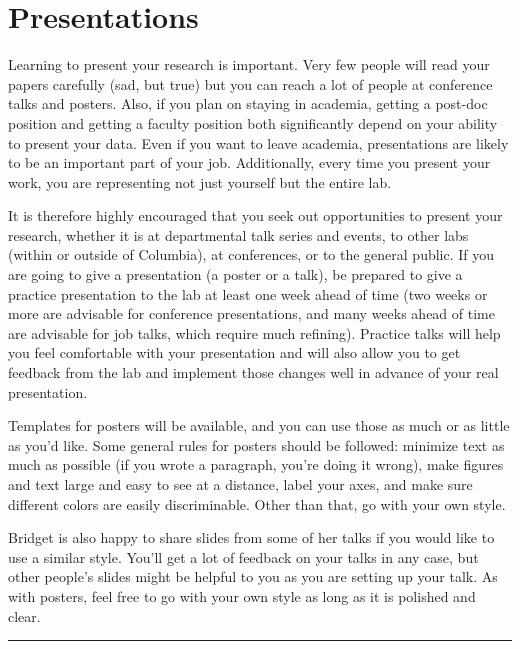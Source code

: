 \documentclass[]{book}
\begin{document}
\hypertarget{presentations}{%
\section{Presentations}\label{presentations}}

Learning to present your research is important. Very few people will read your papers carefully (sad, but true) but you can reach a lot of people at conference talks and posters. Also, if you plan on staying in academia, getting a post-doc position and getting a faculty position both significantly depend on your ability to present your data. Even if you want to leave academia, presentations are likely to be an important part of your job. Additionally, every time you present your work, you are representing not just yourself but the entire lab.

It is therefore highly encouraged that you seek out opportunities to present your research, whether it is at departmental talk series and events, to other labs (within or outside of Columbia), at conferences, or to the general public. If you are going to give a presentation (a poster or a talk), be prepared to give a practice presentation to the lab at least one week ahead of time (two weeks or more are advisable for conference presentations, and many weeks ahead of time are advisable for job talks, which require much refining). Practice talks will help you feel comfortable with your presentation and will also allow you to get feedback from the lab and implement those changes well in advance of your real presentation.

Templates for posters will be available, and you can use those as much or as little as you'd like. Some general rules for posters should be followed: minimize text as much as possible (if you wrote a paragraph, you're doing it wrong), make figures and text large and easy to see at a distance, label your axes, and make sure different colors are easily discriminable. Other than that, go with your own style.

Bridget is also happy to share slides from some of her talks if you would like to use a similar style. You'll get a lot of feedback on your talks in any case, but other people's slides might be helpful to you as you are setting up your talk. As with posters, feel free to go with your own style as long as it is polished and clear.

\begin{center}\rule{0.5\linewidth}{0.5pt}\end{center}
\end{document}
